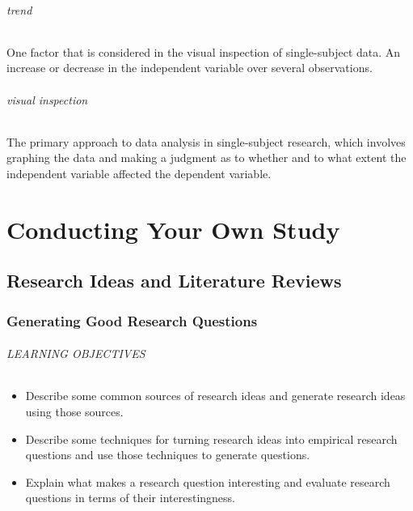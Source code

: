 \documentclass[
]{krantz}
\providecommand{\tightlist}{%
  \setlength{\itemsep}{0pt}\setlength{\parskip}{0pt}}
\begin{document}
\hypertarget{trend}{%
\paragraph*{trend}\label{trend}}

One factor that is considered in the visual inspection of single-subject data. An increase or decrease in the independent variable over several observations.

\hypertarget{visual-inspection}{%
\paragraph*{visual inspection}\label{visual-inspection}}

The primary approach to data analysis in single-subject research, which involves graphing the data and making a judgment as to whether and to what extent the independent variable affected the dependent variable.

\hypertarget{part-conducting-your-own-study}{%
\part*{Conducting Your Own Study}\label{part-conducting-your-own-study}}


\hypertarget{research-ideas-and-literature-reviews}{%
\chapter{Research Ideas and Literature Reviews}\label{research-ideas-and-literature-reviews}}

\hypertarget{generating-good-research-questions}{%
\section{Generating Good Research Questions}\label{generating-good-research-questions}}

\hypertarget{learning-objectives-30}{%
\paragraph*{LEARNING OBJECTIVES}\label{learning-objectives-30}}

\begin{itemize}
\tightlist
\item
  Describe some common sources of research ideas and generate research ideas using those sources.
\item
  Describe some techniques for turning research ideas into empirical research questions and use those techniques to generate questions.
\item
  Explain what makes a research question interesting and evaluate research questions in terms of their interestingness.
\end{itemize}
\end{document}
